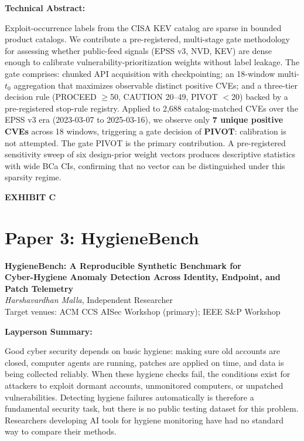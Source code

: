 \documentclass[12pt,letterpaper]{article}
\newenvironment{exhibitbox}{%
  \begin{mdframed}[backgroundcolor=lightblue,linecolor=headblue,linewidth=1.5pt,
                   topline=true,bottomline=true,leftline=true,rightline=true,
                   innertopmargin=12pt,innerbottommargin=12pt,
                   innerleftmargin=14pt,innerrightmargin=14pt]
}{%
  \end{mdframed}
}
\newcommand{\exhibitlabel}[1]{%
  \begin{center}
    \large\bfseries\textcolor{headblue}{#1}
  \end{center}
}
\begin{document}
\vspace{0.5em}
\noindent\textbf{Technical Abstract:}

\begin{exhibitbox}
Exploit-occurrence labels from the CISA KEV catalog are sparse in bounded product
catalogs. We contribute a pre-registered, multi-stage gate methodology for
assessing whether public-feed signals (EPSS v3, NVD, KEV) are dense enough to
calibrate vulnerability-prioritization weights without label leakage. The gate
comprises: chunked API acquisition with checkpointing; an 18-window multi-$t_0$
aggregation that maximizes observable distinct positive CVEs; and a three-tier
decision rule (PROCEED $\geq$50, CAUTION 20--49, PIVOT $<$20) backed by a
pre-registered stop-rule registry. Applied to 2,688 catalog-matched CVEs over
the EPSS v3 era (2023-03-07 to 2025-03-16), we observe only \textbf{7 unique
positive CVEs} across 18 windows, triggering a gate decision of
\textbf{PIVOT}: calibration is not attempted. The gate PIVOT is the primary
contribution. A pre-registered sensitivity sweep of six design-prior weight
vectors produces descriptive statistics with wide BCa CIs, confirming that
no vector can be distinguished under this sparsity regime.
\end{exhibitbox}

\newpage

\exhibitlabel{EXHIBIT C}
\section{Paper 3: HygieneBench}

\begin{center}
  \textbf{\large HygieneBench: A Reproducible Synthetic Benchmark for\\
  Cyber-Hygiene Anomaly Detection Across Identity, Endpoint, and Patch Telemetry}\\[0.5em]
  \textit{Harshavardhan Malla}, Independent Researcher\\[0.5em]
  Target venues: ACM CCS AISec Workshop (primary); IEEE S\&P Workshop
\end{center}

\vspace{1em}
\noindent\textbf{Layperson Summary:}

Good cyber security depends on basic hygiene: making sure old accounts are
closed, computer agents are running, patches are applied on time, and data
is being collected reliably. When these hygiene checks fail, the conditions
exist for attackers to exploit dormant accounts, unmonitored computers, or
unpatched vulnerabilities. Detecting hygiene failures automatically is
therefore a fundamental security task, but there is no public testing
dataset for this problem. Researchers developing AI tools for hygiene
monitoring have had no standard way to compare their methods.
\end{document}
